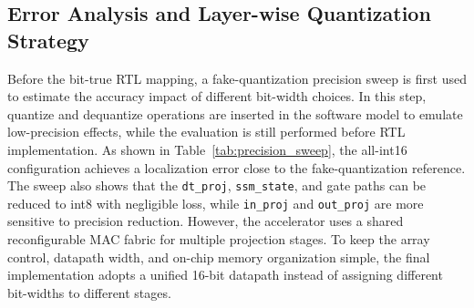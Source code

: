 \documentclass[11pt,twoside]{eitExjobb}
\begin{document}
\subsection{Error Analysis and Layer-wise Quantization Strategy}
\label{subsec:quant_error_strategy}

Before the bit-true RTL mapping, a fake-quantization precision sweep is first used to
estimate the accuracy impact of different bit-width choices. In this step, quantize and
dequantize operations are inserted in the software model to emulate low-precision
effects, while the evaluation is still performed before RTL implementation. As shown in
Table~\ref{tab:precision_sweep}, the all-int16 configuration achieves a localization
error close to the fake-quantization reference. The sweep also shows that the
\texttt{dt\_proj}, \texttt{ssm\_state}, and gate paths can be reduced to int8 with
negligible loss, while \texttt{in\_proj} and \texttt{out\_proj} are more sensitive to
precision reduction. However, the accelerator uses a shared reconfigurable MAC fabric
for multiple projection stages. To keep the array control, datapath width, and on-chip
memory organization simple, the final implementation adopts a unified 16-bit datapath
instead of assigning different bit-widths to different stages.

\begin{table}[H]
\centering
\caption{Fake-quantization precision sweep.}
\label{tab:precision_sweep}
\small
\setlength{\tabcolsep}{5pt}
\end{table}
\end{document}
